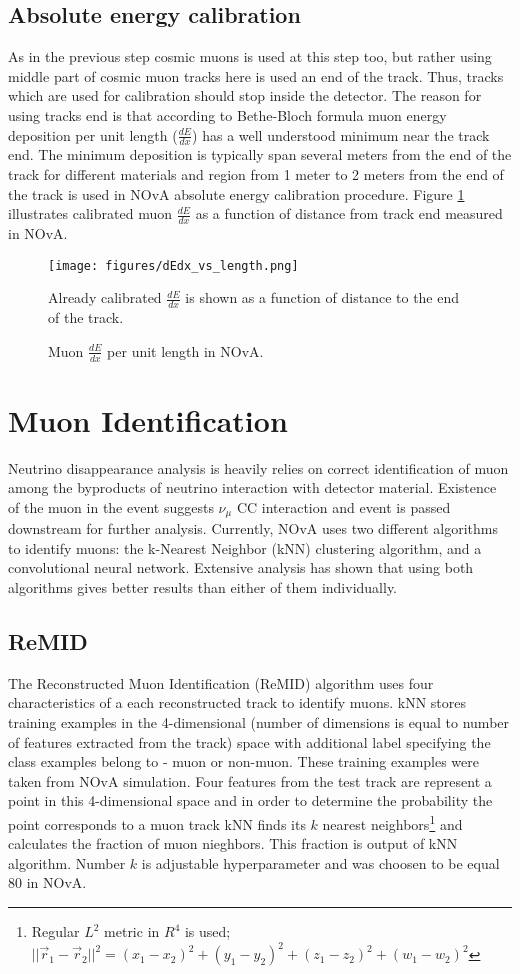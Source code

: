 \subsection{Absolute energy calibration}
As in the previous step cosmic muons is used at this step too, but rather using middle part of cosmic muon tracks
here is used an end of the track. Thus, tracks which are used for calibration should stop inside the detector. 
The reason for using tracks end is that according to Bethe-Bloch formula \cite{rpf} muon energy deposition per 
unit length ($\frac{dE}{dx}$) has a well understood minimum near the track end. The minimum deposition is typically
span several meters from the end of the track for different materials and region from 1 meter to 2 meters from
the end of the track is used in NOvA absolute energy calibration procedure. Figure \ref{fig:dEdx_vs_length} illustrates
calibrated muon $\frac{dE}{dx}$ as a function of distance from track end measured in NOvA.
\begin{figure}[t]
\texttt{[image: figures/dEdx\_vs\_length.png]}
\caption{Muon $\frac{dE}{dx}$ per unit length in NOvA.}
{Already calibrated $\frac{dE}{dx}$ is shown as a function of distance to the end of the track.}
\label{fig:dEdx_vs_length}
\end{figure}

\section{Muon Identification}
Neutrino disappearance analysis is heavily relies on correct identification of muon among the byproducts of 
neutrino interaction with detector material. Existence of the muon in the event suggests $\nu_\mu$ CC interaction
and event is passed downstream for further analysis. Currently, NOvA uses two different algorithms to identify 
muons: the k-Nearest Neighbor (kNN) clustering algorithm, and a convolutional neural network. Extensive analysis 
has shown that using both algorithms gives better results than either of them individually.

\subsection{ReMID}
The Reconstructed Muon Identification (ReMID) algorithm uses four characteristics of a each reconstructed track
to identify muons. kNN stores training examples in the 4-dimensional (number of dimensions
is equal to number of features extracted from the track) space with additional label specifying the class examples
belong to - muon or non-muon. These training examples were taken from NOvA simulation. Four features from the 
test track are represent a point in this 4-dimensional space and in order to determine the probability the point 
corresponds to a muon track kNN finds its $k$ nearest neighbors\footnote{Regular $L^2$ metric in $R^4$ is used;
$||\vec{r}_1 - \vec{r}_2||^2 = (x_1-x_2)^2 + (y_1-y_2)^2 + (z_1-z_2)^2 + (w_1-w_2)^2$} and calculates the 
fraction of muon nieghbors. This fraction is output of kNN algorithm. Number $k$ is adjustable hyperparameter 
and was choosen to be equal 80 in NOvA. 

